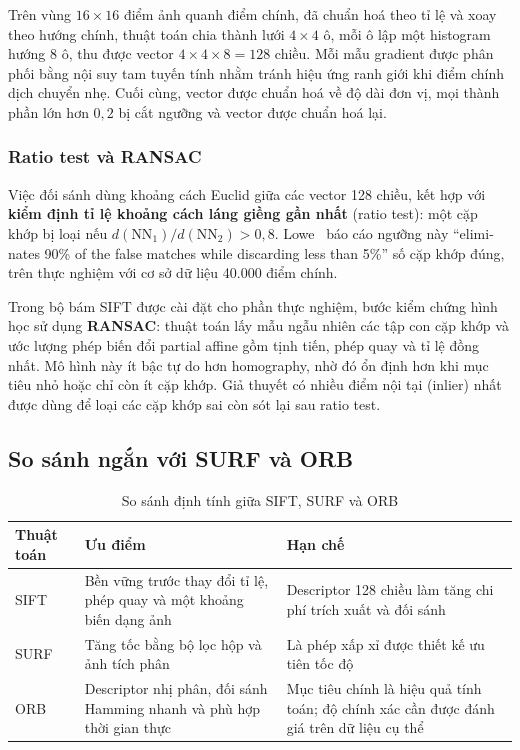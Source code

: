 \documentclass[12pt,a4paper]{article}
\numberwithin{equation}{section}
\begin{document}
Trên vùng $16\times16$ điểm ảnh quanh điểm chính, đã chuẩn hoá theo tỉ lệ và xoay theo hướng
chính, thuật toán chia thành lưới $4\times4$ ô, mỗi ô lập một histogram hướng 8 ô, thu được vector
$4\times4\times8 = 128$ chiều. Mỗi mẫu gradient được phân phối bằng nội suy tam tuyến tính nhằm
tránh hiệu ứng ranh giới khi điểm chính dịch chuyển nhẹ. Cuối cùng, vector được chuẩn hoá về độ
dài đơn vị, mọi thành phần lớn hơn $0{,}2$ bị cắt ngưỡng và vector được chuẩn hoá lại.

\subsubsection{Ratio test và RANSAC}

Việc đối sánh dùng khoảng cách Euclid giữa các vector 128 chiều, kết hợp với \textbf{kiểm định tỉ
lệ khoảng cách láng giềng gần nhất} (ratio test): một cặp khớp bị loại nếu
$d(\text{NN}_1)/d(\text{NN}_2) > 0{,}8$. Lowe~\cite{lowe2004} báo cáo ngưỡng này
\textenglish{``eliminates 90\% of the false matches while discarding less than 5\%''} số cặp khớp
đúng, trên thực nghiệm với cơ sở dữ liệu 40.000 điểm chính.

Trong bộ bám SIFT được cài đặt cho phần thực nghiệm, bước kiểm chứng hình học sử dụng
\textbf{RANSAC}: thuật toán lấy mẫu ngẫu nhiên các tập con cặp khớp và ước lượng phép biến đổi
partial affine gồm tịnh tiến, phép quay và tỉ lệ đồng nhất. Mô hình này ít bậc tự do hơn homography,
nhờ đó ổn định hơn khi mục tiêu nhỏ hoặc chỉ còn ít cặp khớp. Giả thuyết có nhiều điểm nội tại
(inlier) nhất được dùng để loại các cặp khớp sai còn sót lại sau ratio test.

\subsection{So sánh ngắn với SURF và ORB}

\begin{table}[H]
\centering
\caption{So sánh định tính giữa SIFT, SURF và ORB}
\label{tab:sift-surf-orb}
\small
\begin{tabular}{@{}lp{5.2cm}p{5.2cm}@{}}
\toprule
\textbf{Thuật toán} & \textbf{Ưu điểm} & \textbf{Hạn chế} \\
\midrule
SIFT~\cite{lowe2004} & Bền vững trước thay đổi tỉ lệ, phép quay và một khoảng biến dạng ảnh & Descriptor 128 chiều làm tăng chi phí trích xuất và đối sánh \\
SURF~\cite{bay2006} & Tăng tốc bằng bộ lọc hộp và ảnh tích phân & Là phép xấp xỉ được thiết kế ưu tiên tốc độ \\
ORB~\cite{rublee2011} & Descriptor nhị phân, đối sánh Hamming nhanh và phù hợp thời gian thực & Mục tiêu chính là hiệu quả tính toán; độ chính xác cần được đánh giá trên dữ liệu cụ thể \\
\bottomrule
\end{tabular}
\end{table}
\end{document}
